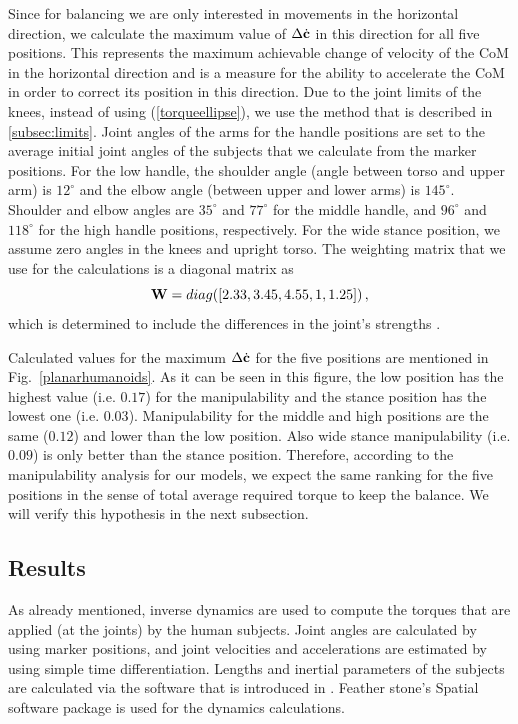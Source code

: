 Since for balancing we are only interested in movements in the horizontal
direction, we calculate the maximum value of $\Delta \dot{\mathbf{c}}$ in this
direction for all five positions.  This represents the maximum achievable
change of velocity of the CoM in the horizontal direction and is a measure for
the ability to accelerate the CoM in order to correct its position in this
direction.  Due to the joint limits of the knees, instead of using
(\ref{torqueellipse}), we use the method that is described in
\ref{subsec:limits}.  Joint angles of the arms for the handle positions are
set to the average initial joint angles of the subjects that we calculate from
the marker positions.  For the low handle, the shoulder angle (angle between
torso and upper arm) is $12^\circ$ and the elbow angle (between upper and
lower arms) is $145^\circ$.  Shoulder and elbow angles are $35^\circ$ and
$77^\circ$ for the middle handle, and $96^\circ$ and $118^\circ$ for the high
handle positions, respectively.  For the wide stance position, we assume zero
angles in the knees and upright torso.  The weighting matrix that we use for
the calculations is a diagonal matrix as
%
\begin{equation}
  \mathbf{W} = diag([2.33, 3.45, 4.55, 1, 1.25]) \, ,
\end{equation}
%
which is determined to include the differences in the joint's strengths
\cite{Anderson2007, Bober2002, Gandevia1998, Moraux2013}.

Calculated values for the maximum $\Delta \dot{\mathbf{c}}$ for the five positions
are mentioned in Fig.~\ref{planarhumanoids}.  As it can be seen in this
figure, the low position has the highest value (i.e. $0.17$) for the
manipulability and the stance position has the lowest one (i.e. $0.03$).
Manipulability for the middle and high positions are the same ($0.12$) and
lower than the low position.  Also wide stance manipulability (i.e. $0.09$) is
only better than the stance position.  Therefore, according to the
manipulability analysis for our models, we expect the same ranking for the
five positions in the sense of total average required torque to keep the
balance.  We will verify this hypothesis in the next subsection.


\subsection{Results}

As already mentioned, inverse dynamics are used to compute the torques that
are applied (at the joints) by the human subjects.  Joint angles are
calculated by using marker positions, and joint velocities and accelerations
are estimated by using simple time differentiation.  Lengths and inertial
parameters of the subjects are calculated via the software that is introduced
in \cite{Zlajpah&Babic14}.  Feather stone's Spatial software package
\cite{Featherstone} is used for the dynamics calculations.

